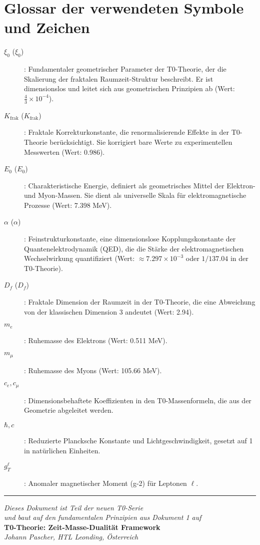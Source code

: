 \documentclass[12pt,a4paper]{article}
\newcommand{\xipar}{\xi_0}
\newcommand{\Kfrak}{K_{\text{frak}}}
\newcommand{\Ezero}{E_0}
\newcommand{\alphaem}{\alpha}
\newcommand{\Dfrak}{D_f}
\begin{document}
	\section{Glossar der verwendeten Symbole und Zeichen}
	\begin{description}
		\item[$\xipar$ ($\xi_0$)]: Fundamentaler geometrischer Parameter der T0-Theorie, der die Skalierung der fraktalen Raumzeit-Struktur beschreibt. Er ist dimensionslos und leitet sich aus geometrischen Prinzipien ab (Wert: $\frac{4}{3} \times 10^{-4}$).
		\item[$\Kfrak$ ($K_{\text{frak}}$)]: Fraktale Korrekturkonstante, die renormalisierende Effekte in der T0-Theorie berücksichtigt. Sie korrigiert bare Werte zu experimentellen Messwerten (Wert: 0.986).
		\item[$\Ezero$ ($E_0$)]: Charakteristische Energie, definiert als geometrisches Mittel der Elektron- und Myon-Massen. Sie dient als universelle Skala für elektromagnetische Prozesse (Wert: 7.398 MeV).
		\item[$\alphaem$ ($\alpha$)]: Feinstrukturkonstante, eine dimensionslose Kopplungskonstante der Quantenelektrodynamik (QED), die die Stärke der elektromagnetischen Wechselwirkung quantifiziert (Wert: $\approx 7.297 \times 10^{-3}$ oder $1/137.04$ in der T0-Theorie).
		\item[$\Dfrak$ ($D_f$)]: Fraktale Dimension der Raumzeit in der T0-Theorie, die eine Abweichung von der klassischen Dimension 3 andeutet (Wert: 2.94).
		\item[$m_e$]: Ruhemasse des Elektrons (Wert: 0.511 MeV).
		\item[$m_\mu$]: Ruhemasse des Myons (Wert: 105.66 MeV).
		\item[$c_e, c_\mu$]: Dimensionsbehaftete Koeffizienten in den T0-Massenformeln, die aus der Geometrie abgeleitet werden.
		\item[$\hbar, c$]: Reduzierte Plancksche Konstante und Lichtgeschwindigkeit, gesetzt auf 1 in natürlichen Einheiten.
		\item[$g_T^\ell$]: Anomaler magnetischer Moment (g-2) für Leptonen $\ell$.
	\end{description}
	
	\begin{center}
		\hrule
		\vspace{0.5cm}
		\textit{Dieses Dokument ist Teil der neuen T0-Serie}\\
		\textit{und baut auf den fundamentalen Prinzipien aus Dokument 1 auf}\\
		\vspace{0.3cm}
		\textbf{T0-Theorie: Zeit-Masse-Dualität Framework}\\
		\textit{Johann Pascher, HTL Leonding, Österreich}\\
	\end{center}
	
	
\end{document}
